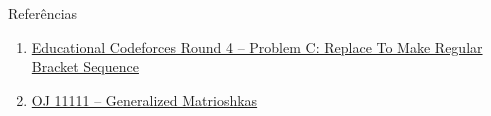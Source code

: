 \begin{frame}[fragile]{Referências}

    \begin{enumerate}
        \item \href{https://codeforces.com/problemset/problem/612/C}{Educational Codeforces Round 4 -- Problem C: Replace To Make Regular Bracket Sequence}

        \item \href{https://onlinejudge.org/index.php?option=com_onlinejudge&Itemid=8&page=show_problem&category=0&problem=2052&mosmsg=Submission+received+with+ID+23047451}{OJ 11111 -- Generalized Matrioshkas}

    \end{enumerate}

\end{frame}
